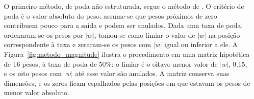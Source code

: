 O primeiro método, de poda não estruturada, segue o método de
. O critério de poda é o valor absoluto do peso: assume-se que pesos
próximos de zero contribuem pouco para a saída e podem ser anulados. Dada uma taxa de poda,
ordenaram-se os pesos por $|w|$, tomou-se como limiar o valor de $|w|$ na posição
correspondente à taxa e zeraram-se os pesos com $|w|$ igual ou inferior a ele. A
Figura~\ref{fig:metodo_magnitude} ilustra o procedimento em uma matriz hipotética de 16
pesos, à taxa de poda de 50\%: o limiar é o oitavo menor valor de $|w|$, 0,15, e os oito
pesos com $|w|$ até esse valor são anulados. A matriz conserva suas dimensões, e os zeros
ficam espalhados pelas posições em que estavam os pesos de menor valor absoluto.

